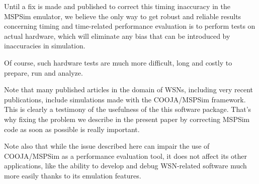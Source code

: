 \documentclass[10pt]{ewsn-proc}
\begin{document}
\medskip

Until a fix is made and published to correct this timing inaccuracy
in the MSPSim emulator, we believe the only way to get robust and reliable
results concerning timing and time-related performance evaluation is
to perform tests on actual hardware, which will eliminate any bias
that can be introduced by inaccuracies in simulation.

Of course, such hardware tests are much more difficult, long and
costly to prepare, run and analyze.

Note that many published articles in the domain of WSNs, including
very recent publications, include simulations made with the COOJA/MSPSim
framework. This is clearly a testimony of the usefulness of the this
software package. That's why fixing the problem we describe in the present
paper by correcting MSPSim code as soon as possible is really important.

Note also that while the issue described here can impair the use of
COOJA/MSPSim as a performance evaluation tool, it does not affect its other
applications, like the ability to develop and debug WSN-related software much
more easily thanks to its emulation features.



\balance


\end{document}
